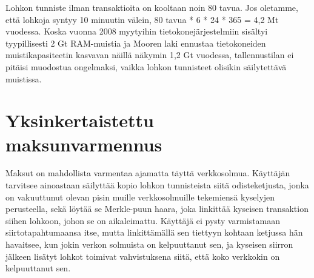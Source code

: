 \documentclass{article}
\begin{document}
Lohkon tunniste ilman transaktioita on kooltaan noin 80 tavua. Jos oletamme, että lohkoja syntyy 10 minuutin välein, 80 tavua * 6 * 24 * 365 = 4,2 Mt vuodessa. Koska vuonna 2008 myytyihin tietokonejärjestelmiin sisältyi tyypillisesti 2 Gt RAM-muistia ja Mooren laki ennustaa tietokoneiden muistikapasiteetin kasvavan näillä näkymin 1,2 Gt vuodessa, tallennustilan ei pitäisi muodostua ongelmaksi, vaikka lohkon tunnisteet olisikin säilytettävä muistissa.

\section{Yksinkertaistettu maksunvarmennus}

Maksut on mahdollista varmentaa ajamatta täyttä verkkosolmua. Käyttäjän tarvitsee ainoastaan säilyttää kopio lohkon tunnisteista siitä odisteketjusta, jonka on vakuuttunut olevan pisin muille verkkosolmuille tekemiensä kyselyjen perusteella, sekä löytää se Merkle-puun haara, joka linkittää kyseisen transaktion siihen lohkoon, johon se on aikaleimattu. Käyttäjä ei pysty varmistamaan siirtotapahtumaansa itse, mutta linkittämällä sen tiettyyn kohtaan ketjussa hän havaitsee, kun jokin verkon solmuista on kelpuuttanut sen, ja kyseisen siirron jälkeen lisätyt lohkot toimivat vahvistuksena siitä, että koko verkkokin on kelpuuttanut sen.
\end{document}
